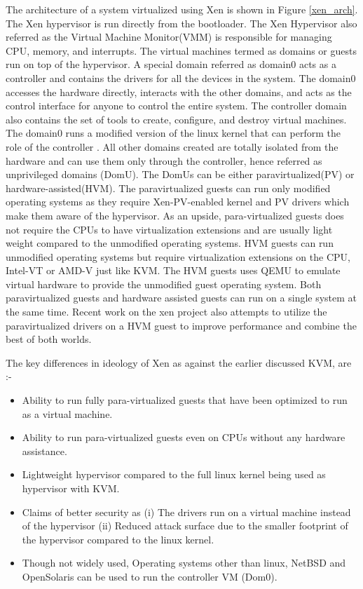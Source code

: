 The architecture of a system virtualized using Xen is shown in Figure \ref{xen_arch}. 
The Xen hypervisor is run directly from the bootloader. The Xen Hypervisor also referred as the Virtual Machine Monitor(VMM) is responsible for managing CPU, memory, and interrupts. The virtual machines termed as domains or guests run on top of the hypervisor. A special domain referred as domain0 acts as a controller and contains the drivers for all the devices in the system. The domain0 accesses the hardware directly, interacts with the other domains, and acts as the control interface for anyone to control the entire system. The controller domain also contains the set of tools to create, configure, and destroy virtual machines. The domain0 runs a modified version of the linux kernel that can perform the role of the controller \cite{dom0_kernels}. All other domains created are totally isolated from the hardware and can use them only through the controller, hence referred as unprivileged domains (DomU). The DomUs can be either paravirtualized(PV) or hardware-assisted(HVM). The paravirtualized guests can run only modified operating systems as they require Xen-PV-enabled kernel and PV drivers which make them aware of the hypervisor. As an upside, para-virtualized guests does not require the CPUs to have virtualization extensions and are usually light weight compared to the unmodified operating systems.  HVM guests can run unmodified operating systems but require virtualization extensions on the CPU, Intel-VT or AMD-V just like KVM. The HVM guests uses QEMU to emulate virtual hardware to provide the unmodified guest operating system. Both paravirtualized guests and hardware assisted guests can run on a single system at the same time. Recent work on the xen project also attempts to utilize the paravirtualized drivers on a HVM guest to improve performance and combine the best of both worlds.



The key differences in ideology of Xen as against the earlier discussed KVM, are :-
\begin{itemize}
\item Ability to run fully para-virtualized guests that have been optimized to run as a virtual machine.


\item Ability to run para-virtualized guests even on CPUs without any hardware assistance.


\item Lightweight hypervisor compared to the full linux kernel being used as hypervisor with KVM.


\item Claims of better security as (i) The drivers run on a virtual machine instead of the hypervisor (ii) Reduced attack surface due to the smaller footprint of the hypervisor compared to the linux kernel. 


\item Though not widely used,  Operating systems other than linux, NetBSD and OpenSolaris can be used to run the controller VM (Dom0).

\end{itemize}






